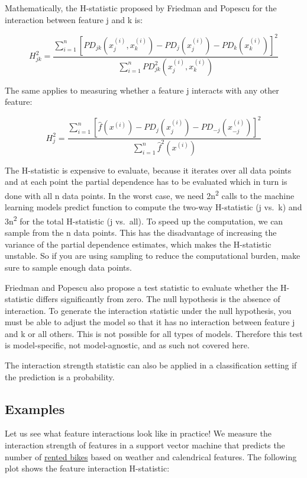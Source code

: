 \documentclass[12pt,]{krantz}
\begin{document}
Mathematically, the H-statistic proposed by Friedman and Popescu for the
interaction between feature j and k is:

\[H^2_{jk} = \frac{\sum_{i=1}^n\left[PD_{jk}(x_{j}^{(i)},x_k^{(i)})-PD_j(x_j^{(i)}) - PD_k(x_{k}^{(i)})\right]^2}{\sum_{i=1}^n{PD}^2_{jk}(x_j^{(i)},x_k^{(i)})}\]

The same applies to measuring whether a feature j interacts with any
other feature:

\[H^2_{j}=\frac{\sum_{i=1}^n\left[\hat{f}(x^{(i)})-PD_j(x_j^{(i)})-PD_{-j}(x_{-j}^{(i)})\right]^2}{\sum_{i=1}^n\hat{f}^2(x^{(i)})}\]

The H-statistic is expensive to evaluate, because it iterates over all
data points and at each point the partial dependence has to be evaluated
which in turn is done with all n data points. In the worst case, we need
2n\textsuperscript{2} calls to the machine learning models predict
function to compute the two-way H-statistic (j vs.~k) and
3n\textsuperscript{2} for the total H-statistic (j vs.~all). To speed up
the computation, we can sample from the n data points. This has the
disadvantage of increasing the variance of the partial dependence
estimates, which makes the H-statistic unstable. So if you are using
sampling to reduce the computational burden, make sure to sample enough
data points.

Friedman and Popescu also propose a test statistic to evaluate whether
the H-statistic differs significantly from zero. The null hypothesis is
the absence of interaction. To generate the interaction statistic under
the null hypothesis, you must be able to adjust the model so that it has
no interaction between feature j and k or all others. This is not
possible for all types of models. Therefore this test is model-specific,
not model-agnostic, and as such not covered here.

The interaction strength statistic can also be applied in a
classification setting if the prediction is a probability.

\subsection{Examples}\label{examples-2}

Let us see what feature interactions look like in practice! We measure
the interaction strength of features in a support vector machine that
predicts the number of \protect\hyperlink{bike-data}{rented bikes} based
on weather and calendrical features. The following plot shows the
feature interaction H-statistic:
\end{document}
